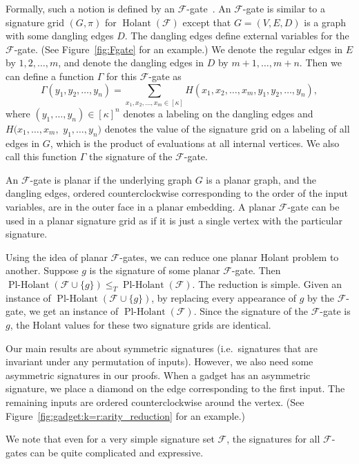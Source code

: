 \documentclass[11pt]{article}
\newcommand{\Holant}{\operatorname{Holant}}
\newcommand{\PlHolant}{\operatorname{Pl-Holant}}
\begin{document}
Formally, such a notion is defined by an $\mathcal{F}$-gate~\cite{CLX09a, CLX10}.
An $\mathcal{F}$-gate is similar to a signature grid $(G, \pi)$ for $\Holant(\mathcal{F})$ except that $G = (V,E,D)$ is a graph with some dangling edges $D$.
The dangling edges define external variables for the $\mathcal{F}$-gate.
(See Figure~\ref{fig:Fgate} for an example.)
We denote the regular edges in $E$ by $1, 2, \dotsc, m$, and denote the dangling edges in $D$ by $m+1, \dotsc, m+n$.
Then we can define a function $\Gamma$ for this $\mathcal{F}$-gate as
\[
 \Gamma(y_1, y_2, \dotsc, y_n) = \sum_{x_1, x_2, \dotsc, x_m \in [\kappa]} H(x_1, x_2, \dotsc, x_m, y_1, y_2, \dotsc, y_n),
\]
where $(y_1, \dotsc, y_n) \in [\kappa]^n$ denotes a labeling on the dangling edges
and $H(x_1, \dotsc, x_m,$ $y_1, \dotsc, y_n)$ denotes the value of the signature grid on a labeling of all edges in $G$,
which is the product of evaluations at all internal vertices.
We also call this function $\Gamma$ the signature of the $\mathcal{F}$-gate.

An $\mathcal{F}$-gate is planar if the underlying graph $G$ is a planar graph,
and the dangling edges,
ordered counterclockwise corresponding to the order of the input variables,
are in the outer face in a planar embedding.
A planar $\mathcal{F}$-gate can be used in a planar signature grid as if it is just a single vertex with the particular signature.

Using the idea of planar $\mathcal{F}$-gates,
we can reduce one planar Holant problem to another.
Suppose $g$ is the signature of some planar $\mathcal{F}$-gate.
Then $\PlHolant(\mathcal{F} \cup \{g\}) \leq_T \PlHolant(\mathcal{F})$.
The reduction is simple.
Given an instance of $\PlHolant(\mathcal{F} \cup \{g\})$,
by replacing every appearance of $g$ by the $\mathcal{F}$-gate,
we get an instance of $\PlHolant(\mathcal{F})$.
Since the signature of the $\mathcal{F}$-gate is $g$,
the Holant values for these two signature grids are identical.

Our main results are about symmetric signatures
(i.e.~signatures that are invariant under any permutation of inputs).
However, we also need some asymmetric signatures in our proofs.
When a gadget has an asymmetric signature,
we place a diamond on the edge corresponding to the first input.
The remaining inputs are ordered counterclockwise around the vertex.
(See Figure~\ref{fig:gadget:k=r:arity_reduction} for an example.)

We note that even for a very simple signature set $\mathcal{F}$,
the signatures for all $\mathcal{F}$-gates can be quite complicated and expressive.
\end{document}

